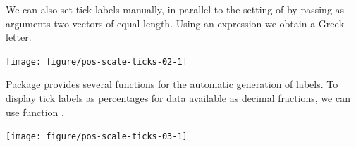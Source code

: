 \documentclass[krantz2]{krantz}\usepackage{knitr}%
\begin{document}
\begin{knitrout}\footnotesize
{}\color{fgcolor}\begin{kframe}
\begin{alltt}
  \hlstd{(} \hlopt{::}\hlstd{(} \hlstd{=} \hlstd{))}
\end{alltt}
\end{kframe}
\end{knitrout}

We can also set tick labels manually, in parallel to the setting of  by passing as arguments two vectors of equal length. Using an expression we obtain a Greek letter.

\begin{knitrout}\footnotesize
{}\color{fgcolor}\begin{kframe}
\begin{alltt}
  \hlopt{+}
  \hlstd{()} \hlopt{+}
  \hlstd{(} \hlstd{=} \hlstd{(} \hlopt{*} \hlstd{,} \hlstd{,} \hlstd{),}
                      \hlstd{=} \hlstd{(}\hlstd{,} \hlstd{(}\hlopt{*} \hlstd{,} \hlstd{))}
\end{alltt}
\end{kframe}

{\centering \texttt{[image: figure/pos-scale-ticks-02-1]} 

}



\end{knitrout}

Package  provides several functions for the automatic generation of labels. To display tick labels as percentages for data available as decimal fractions, we can use function .

\begin{knitrout}\footnotesize
{}\color{fgcolor}\begin{kframe}
\begin{alltt}
  \hlopt{/}  \hlopt{+}
  \hlstd{()} \hlopt{+}
  \hlstd{(} \hlopt{::}
\end{alltt}
\end{kframe}

{\centering \texttt{[image: figure/pos-scale-ticks-03-1]} 

}



\end{knitrout}
\end{document}
